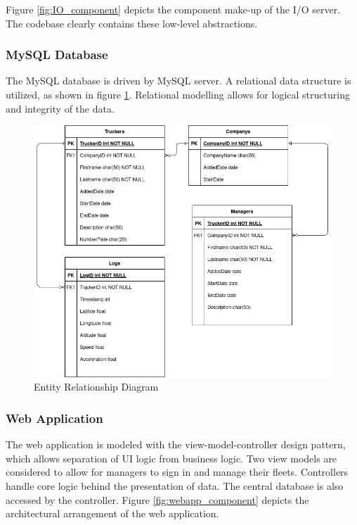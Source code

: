 Figure \ref{fig:IO_component} depicts the component make-up of the I/O server.
The codebase clearly contains these low-level abstractions.

\subsubsection{MySQL Database}
The MySQL database is driven by MySQL server.
A relational data structure is utilized, as shown in figure \ref{fig:ERD_Overview}.
Relational modelling allows for logical structuring and integrity of the data.
\begin{figure}[H]
\centering
\includegraphics[width=6in]{ERD_Overview.png}
\caption{Entity Relationship Diagram}
\label{fig:ERD_Overview}
\end{figure}

\subsubsection{Web Application}
The web application is modeled with the view-model-controller design pattern, which allows separation of UI logic from business logic.
Two view models are considered to allow for managers to sign in and manage their fleets.
Controllers handle core logic behind the presentation of data.
The central database is also accessed by the controller.
Figure \ref{fig:webapp_component} depicts the architectural arrangement of the web application.

